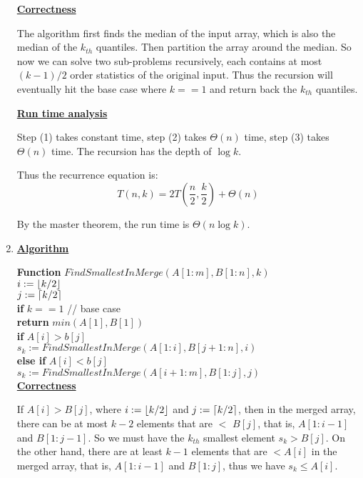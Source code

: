 \documentclass[11pt]{article}
\DeclarePairedDelimiter\ceil{\lceil}{\rceil}
\DeclarePairedDelimiter\floor{\lfloor}{\rfloor}
\begin{document}
\begin{enumerate}
  \underline{\textbf{Correctness}}

  The algorithm first finds the median of the input array, which is
  also the median of the $k_{th}$ quantiles. Then partition the array
  around the median. So now we can solve two sub-problems recursively,
  each contains at most $(k-1)/2$ order statistics of the original
  input. Thus the recursion will eventually hit the base case where
  $k==1$ and return back the $k_{th}$ quantiles.

  \underline{\textbf{Run time analysis}}

  Step (1) takes constant time, step (2) takes $\Theta(n)$ time, step
  (3) takes $\Theta(n)$ time. The recursion has the depth of $\log {k}$.

  Thus the recurrence equation is:
  \begin{equation}
    T(n, k) = 2T(\frac{n}{2}, \frac{k}{2}) + \Theta(n)
  \end{equation}

  By the master theorem, the run time is $\Theta(n\log {k})$.

\item %
  \underline{\textbf{Algorithm}}  

  \textbf{Function} $FindSmallestInMerge(A[1:m], B[1:n], k)$\\
  \-\hspace{2em} $i := \floor{k/2}$ \\
  \-\hspace{2em} $j := \ceil{k/2}$ \\
  \-\hspace{2em} \textbf{if} $k == 1$ // base case \\
  \-\hspace{4em} \textbf{return} $min(A[1], B[1])$  \\
  \-\hspace{2em} \textbf{if} $A[i] > b[j]$ \\
  \-\hspace{4em} $ s_k := FindSmallestInMerge(A[1:i], B[j+1:n], i)$\\ 
  \-\hspace{2em} \textbf{else if} $A[i] < b[j]$ \\
  \-\hspace{4em} $ s_k := FindSmallestInMerge(A[i+1:m], B[1:j], j)$\\ 

  \underline{\textbf{Correctness}}

  If $A[i] > B[j]$, where $i := \floor{k/2}$ and $j := \ceil{k/2}$,
  then in the merged array, there can be at most $k-2$ elements that
  are $<$ $B[j]$, that is, $A[1:i-1]$ and $B[1:j-1]$. So we must have
  the $k_{th}$ smallest element $s_k > B[j]$. On the other hand, there
  are at least $k-1$ elements that are $< A[i]$ in the merged array,
  that is, $A[1:i-1]$ and $B[1:j]$, thus we have $s_k \leq A[i]$.


\end{enumerate}
\end{document}
